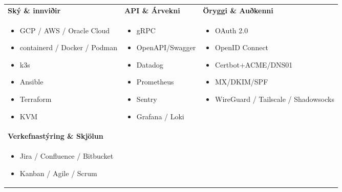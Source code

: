 \documentclass[a4paper,10pt]{article}
\begin{document}
\begin{tabular}{L{\skillcolwidth}|L{\skillcolwidth}|L{\skillcolwidth}}
  \textbf{Ský \& innviðir} & 
  \textbf{API \& Árvekni} & 
  \textbf{Öryggi \& Auðkenni} \\
  \begin{itemize}[leftmargin=*]
    \item GCP / AWS / Oracle Cloud
    \item containerd / Docker / Podman
    \item k3s
    \item Ansible
    \item Terraform
    \item KVM
  \end{itemize} & 
  \begin{itemize}[leftmargin=*]
    \item gRPC
    \item OpenAPI/Swagger
    \item Datadog
    \item Prometheus
    \item Sentry
    \item Grafana / Loki
  \end{itemize} & 
  \begin{itemize}[leftmargin=*]
    \item OAuth 2.0
    \item OpenID Connect
    \item Certbot+ACME/DNS01
    \item MX/DKIM/SPF
    \item WireGuard / Tailscale / Shadowsocks
   \end{itemize} \\
  \hline
  
  \textbf{Verkefnastýring \& Skjölun} & & \\
  \begin{itemize}[leftmargin=*]
    \item Jira / Confluence / Bitbucket
    \item Kanban / Agile / Scrum
  \end{itemize} & & \\
  \end{tabular}
  
\end{document}
